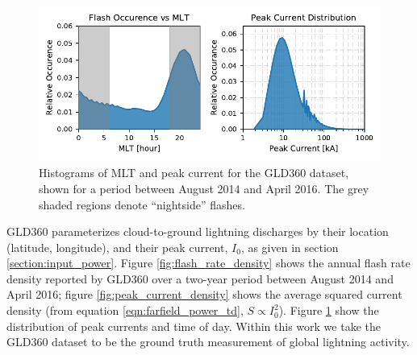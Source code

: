 \begin{figure}[t]
\begin{center}
\includegraphics{figures/MLT_and_IO_distribution.pdf}
\end{center}
\caption[Distributions of peak current and MLT for the GLD360 dataset]{Histograms of MLT and peak current for the GLD360 dataset, shown for a period between August 2014 and April 2016. The grey shaded regions denote ``nightside'' flashes.}
\label{fig:Io_and_MLT}
\end{figure}


GLD360 parameterizes cloud-to-ground lightning discharges by their location (latitude, longitude), and their peak current, $I_0$, as given in section \ref{section:input_power}. Figure \ref{fig:flash_rate_density} shows the annual flash rate density reported by GLD360 over a two-year period between August 2014 and April 2016; figure \ref{fig:peak_current_density} shows the average squared current density (from equation \eqref{eqn:farfield_power_td}, $S \propto I_0^2$). Figure \ref{fig:Io_and_MLT} show the distribution of peak currents and time of day. Within this work we take the GLD360 dataset to be the ground truth measurement of global lightning activity.

